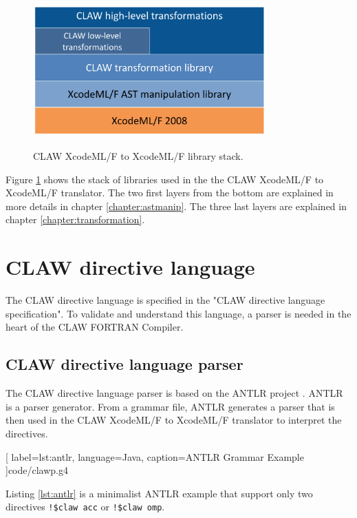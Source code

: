 \documentclass[a4paper, 11pt]{report}
\def\clawfcomp{CLAW FORTRAN Compiler\xspace}
\def\xcodeml{XcodeML/F\xspace}
\begin{document}
\begin{figure}[!ht]
  \centering
  \includegraphics[width=0.8\textwidth]{resources/cx2x_stack.png} \\
  \caption{CLAW \xcodeml to \xcodeml library stack.}
  \label{fig:cx2x_stack}
\end{figure}

Figure \ref{fig:cx2x_stack} shows the stack of libraries used in the the CLAW 
\xcodeml to \xcodeml translator. The two first layers from the bottom are 
explained in more details in chapter \ref{chapter:astmanip}. The three last 
layers are explained in chapter \ref{chapter:transformation}.


\chapter{CLAW directive language}
The CLAW directive language is specified in the "CLAW directive language 
specification". To validate and understand this language, a parser is needed 
in the heart of the \clawfcomp.

\section{CLAW directive language parser}
The CLAW directive language parser is based on the ANTLR project
\cite{Parr:2013:DAR:2501720}. ANTLR is a parser generator. From a grammar file,
ANTLR generates a parser that is then used in the CLAW \xcodeml to \xcodeml 
translator to interpret the directives. 


  [
    label=lst:antlr, 
    language=Java, 
    caption=ANTLR Grammar Example
  ]{code/clawp.g4}

Listing \ref{lst:antlr} is a minimalist ANTLR example that support only two 
directives \lstinline|!$claw acc| or \lstinline|!$claw omp|.
\end{document}

